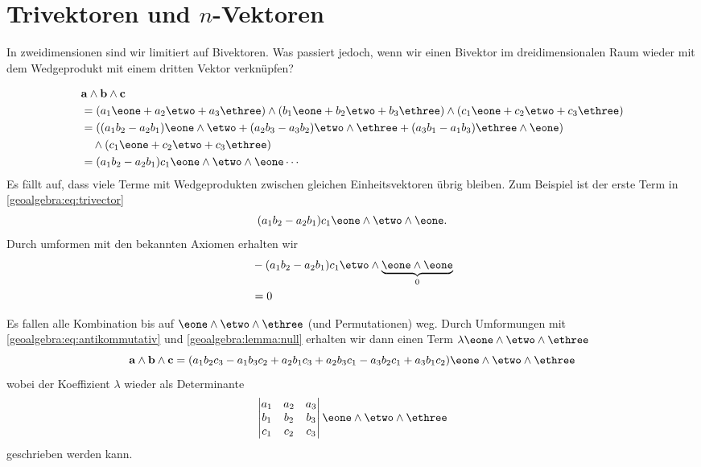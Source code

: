 \section{Trivektoren und $n$-Vektoren}
In zweidimensionen sind wir limitiert auf Bivektoren. Was passiert jedoch, wenn wir einen Bivektor
im dreidimensionalen Raum wieder mit dem Wedgeprodukt mit einem dritten Vektor verknüpfen?

{
\renewcommand{\a}{\mathbf{a}}
\renewcommand{\b}{\mathbf{b}}
\renewcommand{\c}{\mathbf{c}}
\begin{equation} 
\begin{aligned}
&\a \wedge \b \wedge \c \\ 
&= (a_1 \eone + a_2 \etwo + a_3 \ethree) \wedge (b_1 \eone + b_2 \etwo + b_3 \ethree) \wedge (c_1 \eone + c_2 \etwo + c_3 \ethree) \\
&= ((a_1 b_2 - a_2 b_1) \eone \wedge \etwo +(a_2 b_3 - a_3 b_2) \etwo \wedge \ethree +(a_3 b_1 - a_1 b_3) \ethree \wedge \eone) \\
&\quad\wedge (c_1 \eone + c_2 \etwo + c_3 \ethree) \\
&= (a_1 b_2 - a_2 b_1) c_1 \eone \wedge \etwo \wedge \eone \cdots
\end{aligned}
\label{geoalgebra:eq:trivector}
\end{equation}
Es fällt auf, dass viele Terme mit Wedgeprodukten zwischen gleichen Einheitsvektoren übrig bleiben. Zum Beispiel ist der erste Term in \eqref{geoalgebra:eq:trivector}
\begin{equation}
(a_1 b_2 - a_2 b_1) c_1 \eone \wedge \etwo \wedge \eone.
\end{equation}
Durch umformen mit den bekannten Axiomen erhalten wir
\begin{equation}
\begin{aligned}
&-(a_1 b_2 - a_2 b_1) c_1 \etwo \wedge \underbrace{\eone \wedge \eone}_{0} \\
&=0
\end{aligned}
\end{equation}

Es fallen alle Kombination bis auf $\eone \wedge \etwo \wedge \ethree$ (und Permutationen) weg.
Durch Umformungen mit \eqref{geoalgebra:eq:antikommutativ} und
\eqref{geoalgebra:lemma:null} erhalten wir dann einen Term $\lambda \eone \wedge \etwo \wedge \ethree$
\begin{equation}
\a \wedge \b \wedge \c = (a_1 b_2 c_3 - a_1 b_3 c_2 + a_2 b_1 c_3 + a_2 b_3 c_1 - a_3 b_2 c_1 + a_3 b_1 c_2) \eone \wedge \etwo \wedge \ethree
\end{equation}
wobei der Koeffizient $\lambda$ wieder als Determinante
\begin{equation}
\begin{vmatrix} a_1 & a_2 & a_3 \\ b_1 & b_2 & b_3 \\ c_1 & c_2 & c_3 \end{vmatrix} \eone \wedge \etwo \wedge \ethree
\end{equation}
geschrieben werden kann.

}
